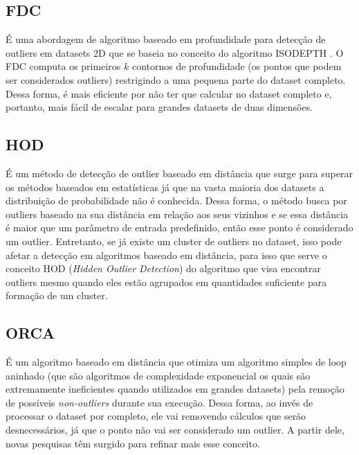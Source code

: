 \subsection{FDC}

É uma abordagem de algoritmo baseado em profundidade \cite{Johnson:1998:FCD:3000292.3000332} para detecção de outliers em datasets 2D que se baseia no conceito do algoritmo ISODEPTH \cite{RUTS1996}. O FDC computa os primeiros $k$ contornos de profundidade (os pontos que podem ser considerados outliers) restrigindo a uma pequena parte do dataset completo. Dessa forma, é mais eficiente por não ter que calcular no dataset completo e, portanto, mais fácil de escalar para grandes datasets de duas dimensões.

\subsection{HOD}

É um método de detecção de outlier baseado em distância \cite{Xu2016} que surge para superar os métodos baseados em estatísticas já que na vasta maioria dos datasets a distribuição de probabilidade não é conhecida. Dessa forma, o método busca por outliers baseado na sua distância em relação aos seus vizinhos e se essa distância é maior que um parâmetro de entrada predefinido, então esse ponto é considerado um outlier. Entretanto, se já existe um cluster de outliers no dataset, isso pode afetar a detecção em algoritmos baseado em distância, para isso que serve o conceito HOD (\textit{Hidden Outlier Detection}) do algoritmo que visa encontrar outliers mesmo quando eles estão agrupados em quantidades suficiente para formação de um cluster.

\subsection{ORCA}

É um algoritmo baseado em distância \cite{Bay:2003:MDO:956750.956758} que otimiza um algoritmo simples de loop aninhado \cite{Knorr:1999:FIK:645925.671529,Knorr:2000:DOA:764212.764218,Ramaswamy:2000:EAM:335191.335437} (que são algoritmos de complexidade exponencial os quais são extremamente ineficientes quando utilizados em grandes datasets)  pela remoção de possíveis \textit{non-outliers} durante sua execução. Dessa forma, ao invés de processar o dataset por completo, ele vai removendo cálculos que serão desnecessários, já que o ponto não vai ser considerado um outlier. A partir dele, novas pesquisas têm surgido para refinar mais esse conceito. 

